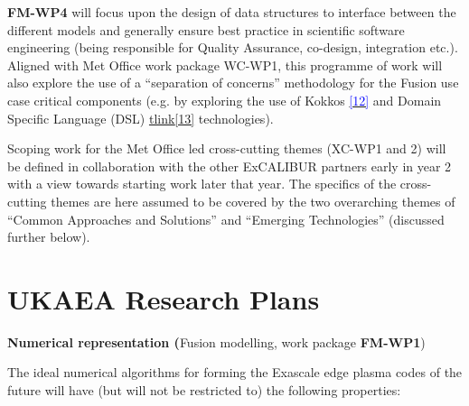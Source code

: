 \documentclass[a4paper]{article}
\newcommand\textstyleInternetlink[1]{\textcolor{blue}{#1}}
\begin{document}
\bigskip

\textbf{FM-WP4} will focus upon the design of data structures to interface 
between the different models and generally
ensure best practice in scientific software engineering (being responsible for 
Quality Assurance, co-design,
integration etc.). Aligned with Met Office work {package WC-WP1, this programme 
of work will also
explore the use of a ``separation of concerns'' methodology for the Fusion use 
case critical components (e.g. by
exploring the use of Kokkos
}\href{https://cfwebprod.sandia.gov/cfdocs/CompResearch/docs/Kokkos-Multi-CoE.pd
f}{\textstyleInternetlink{{[12]}}}{
and Domain Specific Language (DSL)
}\href{https://en.wikipedia.org/wiki/Domain-specific_language}{\textstyleInterne
tlink{{[13]}}}{ technologies}).


\bigskip

Scoping work for the Met Office led cross-cutting themes (XC-WP1 and 2) will be 
defined in collaboration with the other
ExCALIBUR partners early in year 2 with a view towards starting work later that 
year. The specifics of the
cross-cutting themes are here assumed to be covered by the two overarching 
themes of ``Common Approaches and
Solutions'' and ``Emerging Technologies'' (discussed further below).


\bigskip


\bigskip

\section[UKAEA Research 
Plans]{\textcolor[rgb]{0.12156863,0.28627452,0.49019608}{UKAEA Research Plans}}

\bigskip

\textbf{\textcolor[rgb]{0.12156863,0.28627452,0.49019608}{Numerical 
representation
(}}\textcolor[rgb]{0.12156863,0.28627452,0.49019608}{Fusion modelling, work 
package
}\textbf{\textcolor[rgb]{0.12156863,0.28627452,0.49019608}{FM-WP1}}\textcolor[rg
b]{0.12156863,0.28627452,0.49019608}{)}


\bigskip

The ideal numerical algorithms for forming the Exascale edge plasma codes of 
the future will have (but will not be
restricted to) the following properties:


\bigskip


\bigskip
\end{document}
